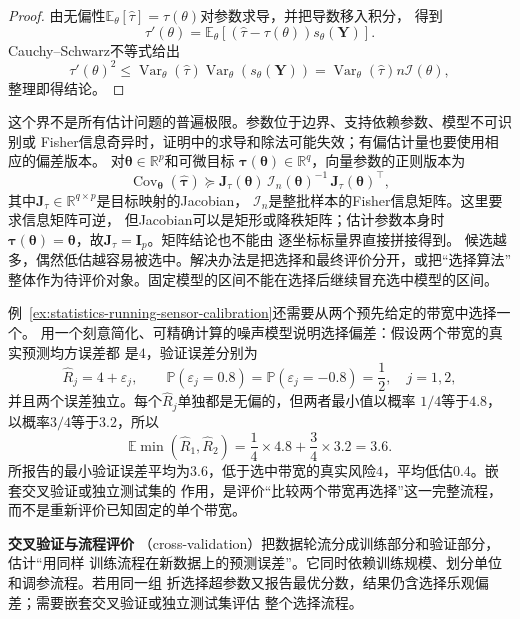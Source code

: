 \begin{proof}
由无偏性\(\mathbb{E}_\theta[\widehat\tau]=\tau(\theta)\)对参数求导，并把导数移入积分，
得到
\[
  \tau'(\theta)
  =\mathbb{E}_\theta[
    (\widehat\tau-\tau(\theta))s_\theta(\bm Y)].
\]
Cauchy--Schwarz不等式给出
\[
  \tau'(\theta)^2\leq
  \operatorname{Var}_\theta(\widehat\tau)
  \operatorname{Var}_\theta(s_\theta(\bm Y))
  =
  \operatorname{Var}_\theta(\widehat\tau)n\mathcal I(\theta),
\]
整理即得结论。
\end{proof}

这个界不是所有估计问题的普遍极限。参数位于边界、支持依赖参数、模型不可识别或
Fisher信息奇异时，证明中的求导和除法可能失效；有偏估计量也要使用相应的偏差版本。
对\(\bm\theta\in\mathbb{R}^p\)和可微目标
\(\bm\tau(\bm\theta)\in\mathbb{R}^q\)，向量参数的正则版本为
\[
  \operatorname{Cov}_{\bm\theta}(\widehat{\bm\tau})
  \succeq
  \bm J_\tau(\bm\theta)\,
  \bm{\mathcal I}_n(\bm\theta)^{-1}\,
  \bm J_\tau(\bm\theta)^\top,
\]
其中\(\bm J_\tau\in\mathbb{R}^{q\times p}\)是目标映射的Jacobian，
\(\bm{\mathcal I}_n\)是整批样本的Fisher信息矩阵。这里要求信息矩阵可逆，
但Jacobian可以是矩形或降秩矩阵；估计参数本身时
\(\bm\tau(\bm\theta)=\bm\theta\)，故\(\bm J_\tau=\bm I_p\)。矩阵结论也不能由
逐坐标标量界直接拼接得到。
候选越多，偶然低估越容易被选中。解决办法是把选择和最终评价分开，或把“选择算法”
整体作为待评价对象。固定模型的区间不能在选择后继续冒充选中模型的区间。

例~\ref{ex:statistics-running-sensor-calibration}还需要从两个预先给定的带宽中选择一个。
用一个刻意简化、可精确计算的噪声模型说明选择偏差：假设两个带宽的真实预测均方误差都
是\(4\)，验证误差分别为
\[
  \widehat R_j=4+\varepsilon_j,\qquad
  \mathbb{P}(\varepsilon_j=0.8)
  =\mathbb{P}(\varepsilon_j=-0.8)=\frac12,
  \quad j=1,2,
\]
并且两个误差独立。每个\(\widehat R_j\)单独都是无偏的，但两者最小值以概率
\(1/4\)等于\(4.8\)，以概率\(3/4\)等于\(3.2\)，所以
\[
  \mathbb{E}\min(\widehat R_1,\widehat R_2)
  =\frac14\times4.8+\frac34\times3.2
  =3.6.
\]
所报告的最小验证误差平均为\(3.6\)，低于选中带宽的真实风险\(4\)，平均低估\(0.4\)。嵌套交叉验证或独立测试集的
作用，是评价“比较两个带宽再选择”这一完整流程，而不是重新评价已知固定的单个带宽。

\par\medskip\noindent\textbf{交叉验证与流程评价}\quad
{}（cross-validation）把数据轮流分成训练部分和验证部分，估计“用同样
训练流程在新数据上的预测误差”。它同时依赖训练规模、划分单位和调参流程。若用同一组
折选择超参数又报告最优分数，结果仍含选择乐观偏差；需要嵌套交叉验证或独立测试集评估
整个选择流程。

